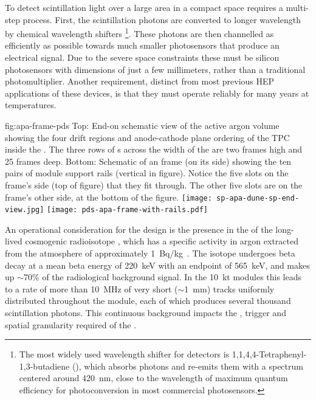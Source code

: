 To detect scintillation light over a large area in a compact space requires a multi-step process.  First, the  scintillation photons are converted to longer wavelength by chemical wavelength shifters
\footnote{The most widely used wavelength shifter for \lar detectors is  1,1,4,4-Tetraphenyl-1,3-butadiene (), 
which absorbs  photons and re-emits them with a spectrum centered around \SI{420}{nm}, close to the wavelength of maximum quantum efficiency for photoconversion in most commercial photosensors.}.
These photons are then channelled as efficiently as possible towards much smaller photosensors that produce an electrical signal. Due to the severe space constraints these must be silicon photosensors with dimensions of just a few millimeters,  rather than a traditional photomultiplier.
Another requirement, distinct from most previous HEP applications of these devices, is that they must operate reliably for many years at \lar temperatures. 

\begin{dunefigure}{fig:apa-frame-pds}
{Top: End-on schematic view of the active argon volume showing the four drift regions and anode-cathode plane ordering of the TPC inside the . The three rows of s across the width of the  are two frames high and 25 frames deep. Bottom: Schematic of an  frame (on its side) showing the ten pairs of  module support rails (vertical in figure). Notice the five slots on the frame's side (top of figure) that they fit through. The other five slots are on the frame's other side, at the bottom of the figure.}
\texttt{[image: sp-apa-dune-sp-end-view.jpg]}
\texttt{[image: pds-apa-frame-with-rails.pdf]}
\end{dunefigure}

An operational consideration for the  design is the presence in the \lartpc of the long-lived cosmogenic radioisotope , which has a specific activity in argon extracted from the atmosphere of approximately \SI{1}{Bq/kg}~\cite{bkds}. The isotope undergoes beta decay at a mean beta energy of \SI{220}{keV} with an endpoint of \SI{565}{keV}, and makes up $\sim$70\% of the radiological background signal.
In the \SI{10}{kt}  modules this leads to a rate of more than \SI{10}{MHz} of very short ($\sim$\SI{1}{mm}) tracks uniformly distributed throughout the module, each of which produces several thousand  scintillation photons. This continuous background impacts the , trigger and spatial granularity required of the .


